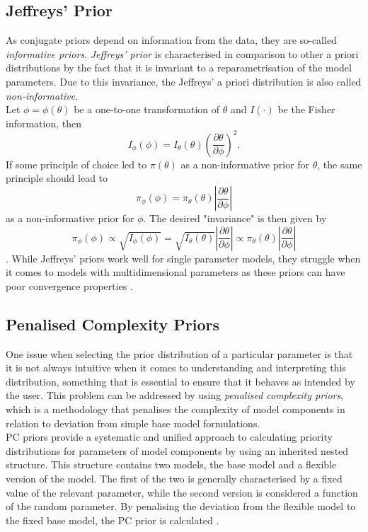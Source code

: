\subsection{Jeffreys' Prior}
As conjugate priors depend on information from the data, they are so-called \textit{informative priors}. \textit{Jeffreys' prior} \autocite[][]{jeffreys1946invariant} is characterised in comparison to other a priori distributions by the fact that it is invariant to a reparametrisation of the model parameters. Due to this invariance, the Jeffreys' a priori distribution is also called \textit{non-informative}. \\
Let $\phi=\phi\left({\theta}\right)$ be a one-to-one transformation of ${\theta}$ and $I\left(\cdot\right)$ be the Fisher information, then
\begin{equation}
    I_{\phi}\left(\phi\right)=I_{\theta}\left({\theta}\right)\left(\frac{\partial{\theta}}{\partial\phi}\right)^2.
\end{equation}
If some principle of choice led to $\pi\left(\theta\right)$ as a non-informative prior for $\theta$, the same principle should lead to
\begin{equation}
    \pi_{\phi}\left(\phi\right)=\pi_{\theta}\left(\theta\right)\left|\frac{\partial\theta}{\partial\phi}\right|
\end{equation}
as a non-informative prior for $\phi$. The desired "invariance" is then given by
\begin{equation}
    \pi_{\phi}\left(\phi\right)\propto \sqrt{I_{\phi}\left(\phi\right)}=\sqrt{I_{\theta}\left(\theta\right)}\left|\frac{\partial\theta}{\partial\phi}\right|\propto \pi_{\theta}\left(\theta\right)\left|\frac{\partial\theta}{\partial\phi}\right|
\end{equation}
\autocite[][42--43]{box2011bayesian}. While Jeffreys' priors work well for single parameter models, they struggle when it comes to models with multidimensional parameters as these priors can have poor convergence properties \autocite[][]{jordan2010}.
\subsection{Penalised Complexity Priors}
One issue when selecting the prior distribution of a particular parameter is that it is not always intuitive when it comes to understanding and interpreting this distribution, something that is essential to ensure that it behaves as intended by the user. This problem can be addressed by using \textit{penalised complexity priors}, which is a methodology that penalises the complexity of model components in relation to deviation from simple base model formulations.\\
PC priors provide a systematic and unified approach to calculating priority distributions for parameters of model components by using an inherited nested structure. This structure contains two models, the base model and a flexible version of the model. The first of the two is generally characterised by a fixed value of the relevant parameter, while the second version is considered a function of the random parameter. By penalising the deviation from the flexible model to the fixed base model, the PC prior is calculated \autocite[][]{simpson2017penalising}.
